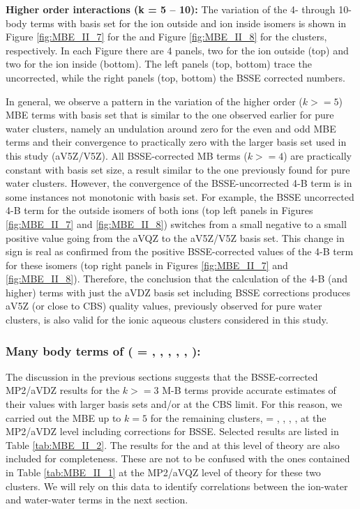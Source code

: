 \documentclass[11pt, proquest]{uwthesis}[2020/02/24]
\let\ce\ch
\begin{document}
\textbf{Higher order interactions (k = 5 – 10):} The variation of the 4- through 10-body terms with basis set for the ion outside and ion inside isomers is shown in Figure \ref{fig:MBE_II_7} for the \ce{Li^+(H2O)9} and Figure \ref{fig:MBE_II_8} for the \ce{Cl^-(H2O)9} clusters, respectively. In each Figure there are 4 panels, two for the ion outside (top) and two for the ion inside (bottom). The left panels (top, bottom) trace the uncorrected, while the right panels (top, bottom) the BSSE corrected numbers.

\par In general, we observe a pattern in the variation of the higher order ($k >= 5$) MBE terms with basis set that is similar to the one observed earlier for pure water clusters,\autocite{heindel_many-body_2020} namely an undulation around zero for the even and odd MBE terms and their convergence to practically zero with the larger basis set used in this study (aV5Z/V5Z). All BSSE-corrected MB terms ($k >= 4$) are practically constant with basis set size, a result similar to the one previously found for pure water clusters.\autocite{heindel_many-body_2020} However, the convergence of the BSSE-uncorrected 4-B term is in some instances not monotonic with basis set. For example, the BSSE uncorrected 4-B term for the outside isomers of both ions (top left panels in Figures \ref{fig:MBE_II_7} and \ref{fig:MBE_II_8}) switches from a small negative to a small positive value going from the aVQZ to the aV5Z/V5Z basis set. This change in sign is real as confirmed from the positive BSSE-corrected values of the 4-B term for these isomers (top right panels in Figures \ref{fig:MBE_II_7} and \ref{fig:MBE_II_8}). Therefore, the conclusion that the calculation of the 4-B (and higher) terms with just the aVDZ basis set including BSSE corrections produces aV5Z (or close to CBS) quality values, previously observed for pure water clusters,\autocite{heindel_many-body_2020} is also valid for the ionic aqueous clusters considered in this study.

\subsubsection{\textbf{Many body terms of \ce{Z^{+/-}(H2O)9} (\ce{Z} = \ce{Li}, \ce{K}, \ce{Cs}, \ce{Cl}, \ce{Br}, \ce{I}):}}

\par The discussion in the previous sections suggests that the BSSE-corrected MP2/aVDZ results for the $k >= 3$ M-B terms provide accurate estimates of their values with larger basis sets and/or at the CBS limit. For this reason, we carried out the MBE up to $k = 5$ for the remaining \ce{Z^{+/-}(H2O)9} clusters, \ce{Z} = \ce{K^+}, \ce{Cs^+}, \ce{Br^-}, \ce{I^-}, at the MP2/aVDZ level including corrections for BSSE. Selected results are listed in Table \ref{tab:MBE_II_2}. The results for the \ce{Li^+(H2O)9} and \ce{Cl^-(H2O)9} at this level of theory are also included for completeness. These are not to be confused with the ones contained in Table \ref{tab:MBE_II_1} at the MP2/aVQZ level of theory for these two clusters. We will rely on this data to identify correlations between the ion-water and water-water terms in the next section.
\end{document}
